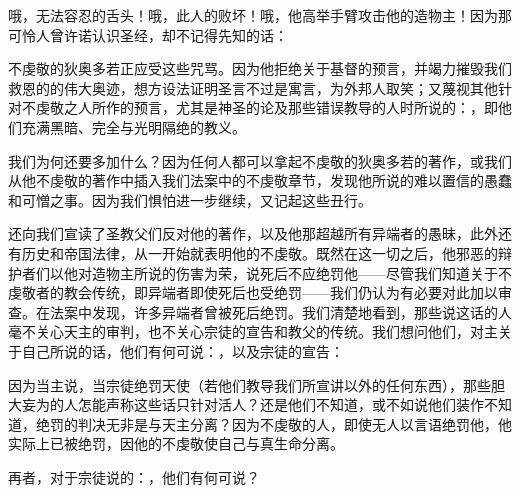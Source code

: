哦，无法容忍的舌头！哦，此人的败坏！哦，他高举手臂攻击他的造物主！因为那可怜人曾许诺认识圣经，却不记得先知的话：\par

不虔敬的狄奥多若正应受这些咒骂。因为他拒绝关于基督的预言，并竭力摧毁我们救恩的的伟大奥迹，想方设法证明圣言不过是寓言，为外邦人取笑；又蔑视其他针对不虔敬之人所作的预言，尤其是神圣的论及那些错误教导的人时所说的：，即他们充满黑暗、完全与光明隔绝的教义。\par

我们为何还要多加什么？因为任何人都可以拿起不虔敬的狄奥多若的著作，或我们从他不虔敬的著作中插入我们法案中的不虔敬章节，发现他所说的难以置信的愚蠢和可憎之事。因为我们惧怕进一步继续，又记起这些丑行。\par

还向我们宣读了圣教父们反对他的著作，以及他那超越所有异端者的愚昧，此外还有历史和帝国法律，从一开始就表明他的不虔敬。既然在这一切之后，他邪恶的辩护者们以他对造物主所说的伤害为荣，说死后不应绝罚他——尽管我们知道关于不虔敬者的教会传统，即异端者即使死后也受绝罚——我们仍认为有必要对此加以审查。在法案中发现，许多异端者曾被死后绝罚。我们清楚地看到，那些说这话的人毫不关心天主的审判，也不关心宗徒的宣告和教父的传统。我们想问他们，对主关于自己所说的话，他们有何可说：，以及宗徒的宣告：\par

因为当主说，当宗徒绝罚天使（若他们教导我们所宣讲以外的任何东西），那些胆大妄为的人怎能声称这些话只针对活人？还是他们不知道，或不如说他们装作不知道，绝罚的判决无非是与天主分离？因为不虔敬的人，即使无人以言语绝罚他，他实际上已被绝罚，因他的不虔敬使自己与真生命分离。\par

再者，对于宗徒说的：，他们有何可说？\par

